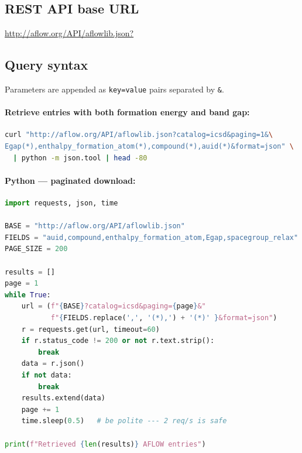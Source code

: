 \documentclass[11pt,a4paper]{article}
\begin{document}
\subsection{REST API base URL}
\begin{center}
\url{http://aflow.org/API/aflowlib.json?}
\end{center}

\subsection{Query syntax}
Parameters are appended as \texttt{key=value} pairs separated by \texttt{\&}.

\paragraph{Retrieve entries with both formation energy and band gap:}
\begin{lstlisting}[language=bash]
curl "http://aflow.org/API/aflowlib.json?catalog=icsd&paging=1&\
Egap(*),enthalpy_formation_atom(*),compound(*),auid(*)&format=json" \
  | python -m json.tool | head -80
\end{lstlisting}

\paragraph{Python --- paginated download:}
\begin{lstlisting}[language=Python]
import requests, json, time

BASE = "http://aflow.org/API/aflowlib.json"
FIELDS = "auid,compound,enthalpy_formation_atom,Egap,spacegroup_relax"
PAGE_SIZE = 200

results = []
page = 1
while True:
    url = (f"{BASE}?catalog=icsd&paging={page}&"
           f"{FIELDS.replace(',', '(*),') + '(*)' }&format=json")
    r = requests.get(url, timeout=60)
    if r.status_code != 200 or not r.text.strip():
        break
    data = r.json()
    if not data:
        break
    results.extend(data)
    page += 1
    time.sleep(0.5)   # be polite --- 2 req/s is safe

print(f"Retrieved {len(results)} AFLOW entries")
\end{lstlisting}
\end{document}
